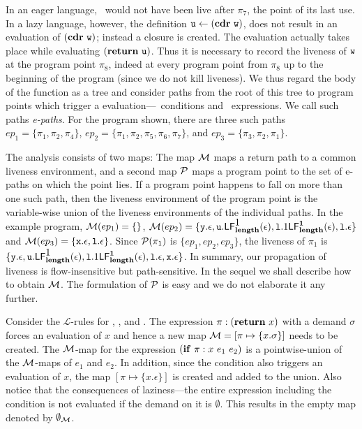 \documentclass[9pt]{sigplanconf}
\begin{document}
In an eager language, \pw\ would not have been live after $\pi_7$, the
point of  its last  use. In a  lazy language, however,  the definition
$\mbox{\tt u}  \leftarrow (\mbox{$\mathbf{cdr}$}~\mbox{\tt w})$,  does  not result  in  an evaluation  of
$(\mbox{$\mathbf{cdr}$}~\mbox{\tt w})$; instead  a closure is created.   The evaluation actually
takes place while evaluating  $(\mbox{$\mathbf{ return}$}~\mbox{\tt u})$. Thus it is necessary to
record the liveness  of $\mbox{\tt w}$ at the program  point $\pi_8$, indeed at
every program  point from $\pi_8$ up  to the beginning  of the program
(since  we do  not kill  liveness).  We  thus regard  the body  of the
function as  a tree and consider paths  from the root of  this tree to
program  points  which  trigger  a evaluation---\SIF\  conditions  and
\RETURN\  expressions.  We  call such  paths {\em  e-paths}.   For the
program shown, there are three such paths $ep_1 = \lbrace\pi_1, \pi_2, \pi_4 \rbrace$, 
$ep_2  =  \lbrace \pi_1, \pi_2,  \pi_5,  \pi_6,  \pi_7 \rbrace$,
 and $ep_3 = \lbrace \pi_3, \pi_2, \pi_1 \rbrace$.

The analysis  consists of  two maps: The  map $\cal{M}$ maps  a return
path to a common liveness environment, and a second map $\cal{P}$ maps
a program  point to the set of  e-paths on which  the point lies.
If a  program  point happens to fall  on more than one  such path, then
the  liveness environment of  the program  point is  the variable-wise
union of  the liveness environments  of the individual paths.   In the
example program, ${\cal M}(ep_1)= \lbrace \rbrace$, ${\cal M}(ep_2)= \lbrace \mbox{\tt y}.\epsilon, \mbox{\tt u}.\mathsf{LF}_{\mathit {\mathbf{length}}}^{\mbox{1}}( {\mathit \epsilon}), \mbox{\tt l}.\mbox{1}\mathsf{LF}_{\mathit {\mathbf{length}}}^{\mathbf{1}}( {\mathit \epsilon}), \mbox{\tt l}.\epsilon  \rbrace  $ and
${\cal M}(ep_3)= \lbrace \mbox{\tt x}.\epsilon, \mbox{\tt l}.\epsilon \rbrace $.
Since  ${\cal P}(\pi_1)$ is  $\lbrace ep_1,ep_2, ep_3 \rbrace$, 
the liveness  of $\pi_1$ is $\lbrace \mbox{\tt y}.\epsilon, \mbox{\tt u}.\mathsf{LF}_{\mathit {\mathbf{length}}}^{\mbox{1}}( {\mathit \epsilon}), \mbox{\tt l}.\mbox{1}\mathsf{LF}_{\mathit {\mathbf{length}}}^{\mathbf{1}}( {\mathit \epsilon}), \mbox{\tt l}.\epsilon,  \mbox{\tt x}.\epsilon  \rbrace$.  In summary,
our propagation of liveness is flow-insensitive but path-sensitive.
In the sequel
we  shall  describe  how  to  obtain $\cal{M}$.   The  formulation  of
$\cal{P}$ is easy and we do not elaborate it any further.

Consider  the $\mathcal{L}$-rules for  {\LET}, {\SIF},  and {\RETURN}.
The  expression $\pi:(\mbox{$\mathbf{ return}$}~x)$  with  a demand  $\sigma$ forces  an
evaluation  of  $x$  and  hence  a  new  map  ${\cal  M}=[\pi  \mapsto
  \{x.\sigma\}] $  needs to  be created.  The  ${\cal M}$-map  for the
expression $(\mbox{$\mathbf{ if}$}~\pi:x~e_1~e_2)$  is a pointwise-union  of the ${\cal
  M}$-maps of $e_1$ and $e_2$.   In addition, since the condition also
triggers an evaluation of  $x$, the map $[\pi \mapsto \{x.\epsilon\}]$
is created and added to  the union.  Also notice that the consequences
of  laziness---the entire  expression including  the condition  is not
evaluated if  the demand  on it is  $\emptyset$.  This results  in the
empty map denoted by $\emptyset_{\cal{M}}$.
\end{document}
